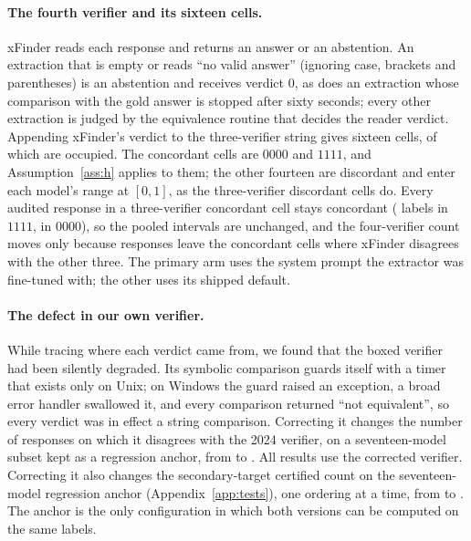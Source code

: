 

\paragraph{The fourth verifier and its sixteen cells.}
xFinder reads each response and returns an answer or an abstention. An extraction that is empty
or reads ``no valid answer'' (ignoring case, brackets and parentheses) is an abstention and
receives verdict $0$, as does an extraction whose comparison with the gold answer is stopped after
sixty seconds; every other extraction is judged by the equivalence routine that decides the reader
verdict. Appending xFinder's verdict to the three-verifier string gives sixteen cells, of which
\KFourCellsOccupied{} are occupied. The concordant cells are $0000$ and $1111$, and
Assumption~\ref{ass:h} applies to them; the other fourteen are discordant and enter each model's
range at $[0,1]$, as the three-verifier discordant cells do. Every audited response in a three-verifier concordant cell stays concordant
(\KFourAuditNAgreeAll{} labels in $1111$, \KFourAuditNRejectAll{} in $0000$), so the pooled
intervals are unchanged, and the four-verifier count moves only because \KFourMovedFromConcordant{}
responses leave the concordant cells where xFinder disagrees with the other three. The primary
arm uses the system prompt the extractor was fine-tuned with; the other uses its shipped
default.

\paragraph{The defect in our own verifier.}
While tracing where each verdict came from, we found that the boxed verifier had been silently
degraded. Its symbolic comparison guards itself with a timer that exists only on Unix; on Windows
the guard raised an exception, a broad error handler swallowed it, and every comparison returned
``not equivalent'', so every verdict was in effect a string comparison. Correcting it changes the
number of responses on which it disagrees with the 2024 verifier, on a seventeen-model subset kept
as a regression anchor, from \DisagreeSbEmSeventeenString{} to \DisagreeSbEmSeventeen{}. All
results use the corrected verifier. Correcting it also changes the secondary-target certified count on the
seventeen-model regression anchor (Appendix~\ref{app:tests}), one ordering at a time, from
\AnchorStringCombined{} to \AnchorSympyCombined{}. The anchor is the only configuration in which
both versions can be computed on the same labels.

